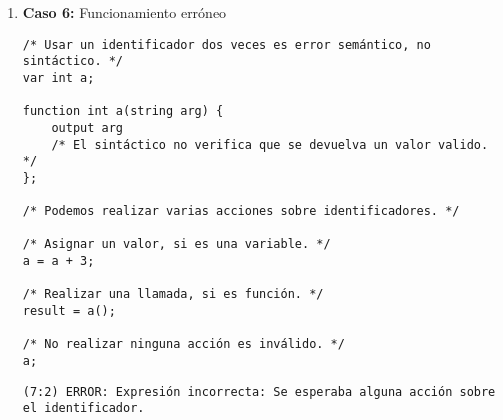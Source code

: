 \begin{enumerate}
    \begin{tcolorbox}[title={Errores detectados}, colback=white]
        \begin{lstlisting}
(5:9) ERROR: Una variable no puede ser de tipo «void».
        \end{lstlisting}
    \end{tcolorbox}

    
    \item \textbf{Caso 6:} Funcionamiento erróneo
    \begin{tcolorbox}[title={Código fuente}, colback=white]
        \begin{lstlisting}
/* Usar un identificador dos veces es error semántico, no sintáctico. */
var int a;

function int a(string arg) {
    output arg
    /* El sintáctico no verifica que se devuelva un valor valido. */
};

/* Podemos realizar varias acciones sobre identificadores. */

/* Asignar un valor, si es una variable. */
a = a + 3;

/* Realizar una llamada, si es función. */
result = a();

/* No realizar ninguna acción es inválido. */
a;
        \end{lstlisting}      
    \end{tcolorbox}

    \begin{tcolorbox}[title={Errores detectados}, colback=white]
        \begin{lstlisting}
(7:2) ERROR: Expresión incorrecta: Se esperaba alguna acción sobre el identificador.
        \end{lstlisting}
    \end{tcolorbox}

\end{enumerate}
